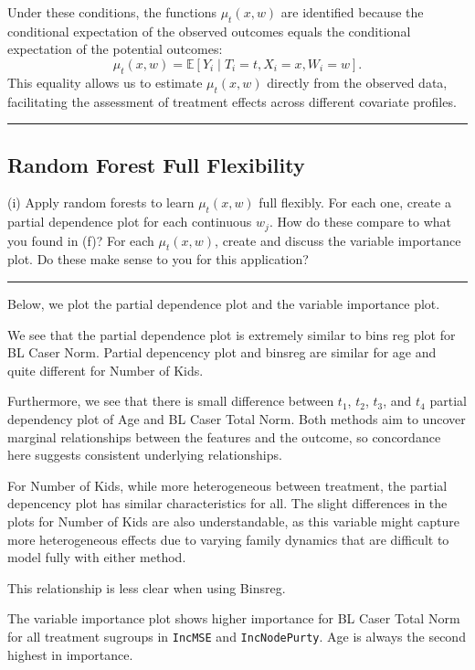 \documentclass{article}
\newenvironment{colorparagraph}[1]{\par\color{#1}}{\par}
\begin{document}
Under these conditions, the functions \( \mu_t(x, w) \) are identified because the conditional expectation of the observed outcomes equals the conditional expectation of the potential outcomes:
\[
\mu_t(x, w) = \mathbb{E}[Y_i \mid T_i = t, X_i = x, W_i = w].
\]
This equality allows us to estimate \( \mu_t(x, w) \) directly from the observed data, facilitating the assessment of treatment effects across different covariate profiles.

\begin{colorparagraph}{questioncolor}
\label{q3i}
\rule{\textwidth}{0.5pt}
\subsection{Random Forest Full Flexibility}
(i) Apply random forests to learn \( \mu_t(x, w) \) full flexibly. For each one, create a partial dependence plot for each continuous \( w_j \). How do these compare to what you found in (f)? For each \( \mu_t(x, w) \), create and discuss the variable importance plot. Do these make sense to you for this application?

\rule{\textwidth}{0.5pt}
\end{colorparagraph}

Below, we plot the partial dependence plot and the variable importance plot.

We see that the partial dependence plot is extremely similar to bins reg plot for BL Caser Norm. Partial depencency plot and binsreg are similar for age and quite different for Number of Kids.

Furthermore, we see that there is small difference between $t_1$, $t_2$, $t_3$, and $t_4$ partial dependency plot of Age and BL Caser Total Norm. Both methods aim to uncover marginal relationships between the features and the outcome, so concordance here suggests consistent underlying relationships.

For Number of Kids, while more heterogeneous between treatment, the partial depencency plot has similar characteristics for all. The slight differences in the plots for Number of Kids are also understandable, as this variable might capture more heterogeneous effects due to varying family dynamics that are difficult to model fully with either method.

This relationship is less clear when using Binsreg. 

The variable importance plot shows higher importance for BL Caser Total Norm for all treatment sugroups in \texttt{IncMSE} and \texttt{IncNodePurty}. Age is always the second highest in importance.
\end{document}

